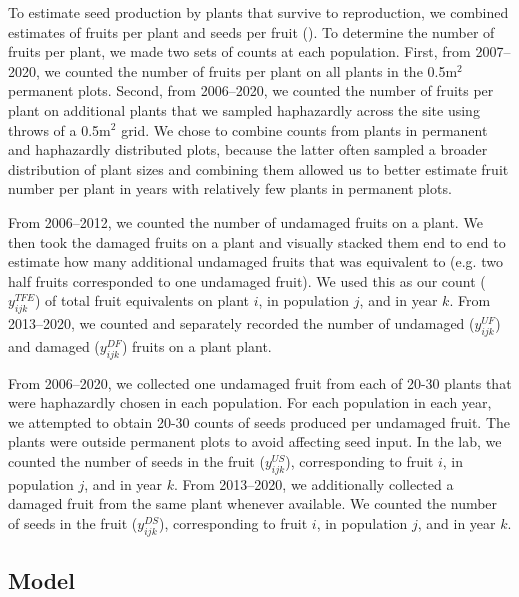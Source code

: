 \documentclass[12pt, oneside]{article}   	%
\begin{document}
To estimate seed production by plants that survive to reproduction, we combined estimates of fruits per plant and seeds per fruit (\cite{eckhart2011}). To determine the number of fruits per plant, we made two sets of counts at each population. First, from 2007--2020, we counted the number of fruits per plant on all plants in the 0.5m$^2$ permanent plots. Second, from 2006--2020, we counted the number of fruits per plant on additional plants that we sampled haphazardly across the site using throws of a 0.5m$^2$ grid. We chose to combine counts from plants in permanent and haphazardly distributed plots, because the latter often sampled a broader distribution of plant sizes and combining them allowed us to better estimate fruit number per plant in years with relatively few plants in permanent plots. 

From 2006--2012, we counted the number of undamaged fruits on a plant. We then took the damaged fruits on a plant and visually stacked them end to end to estimate how many additional undamaged fruits that was equivalent to (e.g. two half fruits corresponded to one undamaged fruit). We used this as our count ($y^{TFE}_{ijk}$) of total fruit equivalents on plant $i$, in population $j$, and in year $k$. From 2013--2020, we counted and separately recorded the number of undamaged ($y^{UF}_{ijk}$) and damaged ($y^{DF}_{ijk}$) fruits on a plant plant. 

From 2006--2020, we collected one undamaged fruit from each of 20-30 plants that were haphazardly chosen in each population. For each population in each year, we attempted to obtain 20-30 counts of seeds produced per undamaged fruit. The plants were outside permanent plots to avoid affecting seed input. In the lab, we counted the number of seeds in the fruit ($y^{US}_{ijk}$), corresponding to fruit $i$, in population $j$, and in year $k$. From 2013--2020, we additionally collected a damaged fruit from the same plant whenever available. We counted the number of seeds in the fruit ($y^{DS}_{ijk}$), corresponding to fruit $i$, in population $j$, and in year $k$.

%
\begin{singlespace*}
 \label{tab:datasets} 
\begin{center}

\end{center}
\end{singlespace*} 

\subsection{Model}
\end{document}
